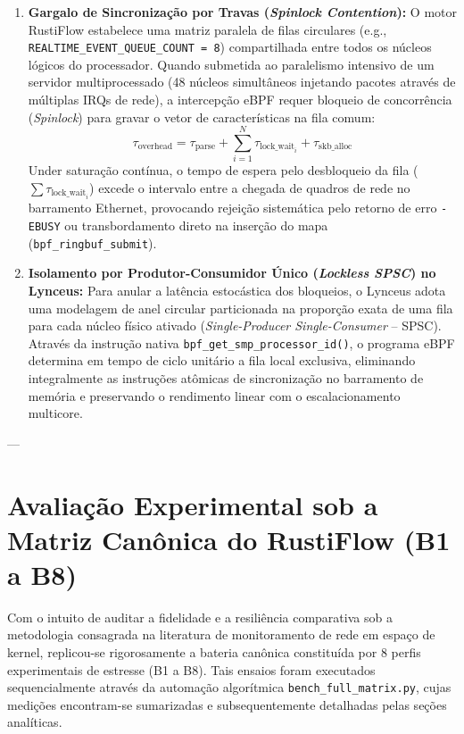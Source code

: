 \documentclass[11pt,a4paper]{article}
\begin{document}
\begin{enumerate}
    \item \textbf{Gargalo de Sincronização por Travas (\textit{Spinlock Contention}):} O motor RustiFlow estabelece uma matriz paralela de filas circulares (e.g., \texttt{REALTIME\_EVENT\_QUEUE\_COUNT = 8}) compartilhada entre todos os núcleos lógicos do processador. Quando submetida ao paralelismo intensivo de um servidor multiprocessado (48 núcleos simultâneos injetando pacotes através de múltiplas IRQs de rede), a intercepção eBPF requer bloqueio de concorrência (\textit{Spinlock}) para gravar o vetor de características na fila comum:
    \[
    \tau_{\text{overhead}} = \tau_{\text{parse}} + \sum_{i=1}^{N} \tau_{\text{lock\_wait}_i} + \tau_{\text{skb\_alloc}}
    \]
    Under saturação contínua, o tempo de espera pelo desbloqueio da fila ($\sum \tau_{\text{lock\_wait}_i}$) excede o intervalo entre a chegada de quadros de rede no barramento Ethernet, provocando rejeição sistemática pelo retorno de erro \texttt{-EBUSY} ou transbordamento direto na inserção do mapa (\texttt{bpf_ringbuf_submit}).
    \item \textbf{Isolamento por Produtor-Consumidor Único (\textit{Lockless SPSC}) no Lynceus:} Para anular a latência estocástica dos bloqueios, o Lynceus adota uma modelagem de anel circular particionada na proporção exata de uma fila para cada núcleo físico ativado (\textit{Single-Producer Single-Consumer} -- SPSC). Através da instrução nativa \texttt{bpf\_get\_smp\_processor\_id()}, o programa eBPF determina em tempo de ciclo unitário a fila local exclusiva, eliminando integralmente as instruções atômicas de sincronização no barramento de memória e preservando o rendimento linear com o escalacionamento multicore.
\end{enumerate}

---

\section{Avaliação Experimental sob a Matriz Canônica do RustiFlow (B1 a B8)}
Com o intuito de auditar a fidelidade e a resiliência comparativa sob a metodologia consagrada na literatura de monitoramento de rede em espaço de kernel, replicou-se rigorosamente a bateria canônica constituída por 8 perfis experimentais de estresse (B1 a B8). Tais ensaios foram executados sequencialmente através da automação algorítmica \texttt{bench\_full\_matrix.py}, cujas medições encontram-se sumarizadas e subsequentemente detalhadas pelas seções analíticas.
\end{document}

